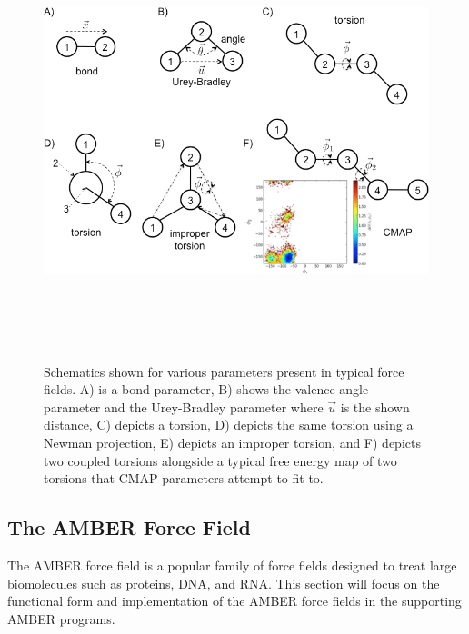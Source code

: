\begin{figure}
   \includegraphics[width=7in,height=5in]{Parameters.png}
   \caption[Schematics shown for various parameters present in typical force
            fields.]
           {Schematics shown for various parameters present in typical force
            fields. A) is a bond parameter, B) shows the valence angle parameter
            and the Urey-Bradley parameter where $\vec{u}$ is the shown
            distance, C) depicts a torsion, D) depicts the same torsion using a
            Newman projection, E) depicts an improper torsion, and F) depicts
            two coupled torsions alongside a typical free energy map of two
            torsions that CMAP parameters attempt to fit to.}
   \label{fig1:Parameters}
\end{figure}

\subsection{The AMBER Force Field}

The AMBER force field is a popular family of force fields designed to treat
large biomolecules such as proteins, DNA, and RNA. This section will focus on
the functional form and implementation of the AMBER force fields
\cite{Cornell_JAmChemSoc_1995_v117_p5179, Duan03, Hornak_Proteins_2006_v65_p712}
in the supporting AMBER programs. \cite{Case_JComputChem_2005_v26_p1668}

